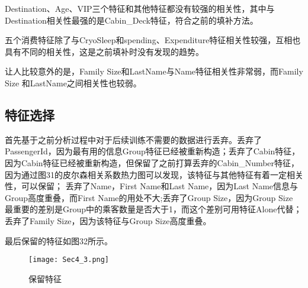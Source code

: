 \documentclass[../main.tex]{subfiles}
\begin{document}
            Destination、Age、VIP三个特征和其他特征都没有较强的相关性，其中与Destination相关性最强的是Cabin\_Deck特征，符合之前的填补方法。

            五个消费特征除了与CryoSleep和spending、Expenditure特征相关性较强，互相也具有不同的相关性，这是之前填补时没有发现的趋势。

            让人比较意外的是，Family Size和LastName与Name特征相关性非常弱，而Family Size 和LastName之间相关性也较弱。
            

    \subsection{特征选择}

        首先基于之前分析过程中对于后续训练不需要的数据进行丢弃。丢弃了PassengerId，因为最有用的信息Group特征已经被重新构造；丢弃了Cabin特征，因为Cabin特征已经被重新构造，但保留了之前打算丢弃的Cabin\_Number特征，因为通过图31的皮尔森相关系数热力图可以发现，该特征与其他特征有着一定相关性，可以保留；
        丢弃了Name，First Name和Last Name，因为Last Name信息与Group高度重叠，而First Name的用处不大;丢弃了Group Size，因为Group Size 最重要的差别是Group中的乘客数量是否大于1，而这个差别可用特征Alone代替；
        丢弃了Family Size，因为该特征与Group Size高度重叠。

        最后保留的特征如图32所示。

        \begin{figure}[H]
            \centering
            \texttt{[image: Sec4\_3.png]}
            \caption{保留特征}
        \end{figure}
\end{document}
